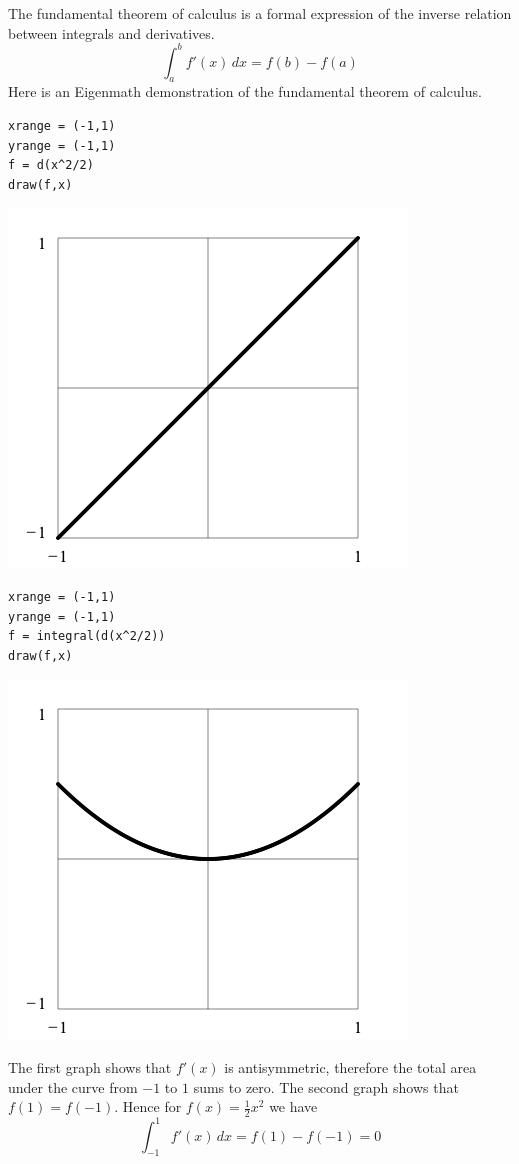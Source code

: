 
\bigskip
\noindent
The fundamental theorem of calculus
is a formal expression of the inverse relation between
integrals and derivatives.
$$\int_a^b f'(x)\,dx=f(b)-f(a)$$
Here is an Eigenmath demonstration of the fundamental theorem of calculus.

\begin{Verbatim}[formatcom=\color{blue},samepage=true]
xrange = (-1,1)
yrange = (-1,1)
f = d(x^2/2)
draw(f,x)
\end{Verbatim}

\begin{center}
\includegraphics[scale=0.5]{funda1.png}
\end{center}

\begin{Verbatim}[formatcom=\color{blue},samepage=true]
xrange = (-1,1)
yrange = (-1,1)
f = integral(d(x^2/2))
draw(f,x)
\end{Verbatim}

\begin{center}
\includegraphics[scale=0.5]{funda2.png}
\end{center}

\noindent
The first graph shows that $f'(x)$ is antisymmetric, therefore the total
area under the curve from $-1$ to $1$ sums to zero.
The second graph shows that $f(1)=f(-1)$.
Hence for $f(x)=\tfrac{1}{2}x^2$ we have
$$\int_{-1}^1f'(x)\,dx=f(1)-f(-1)=0$$
